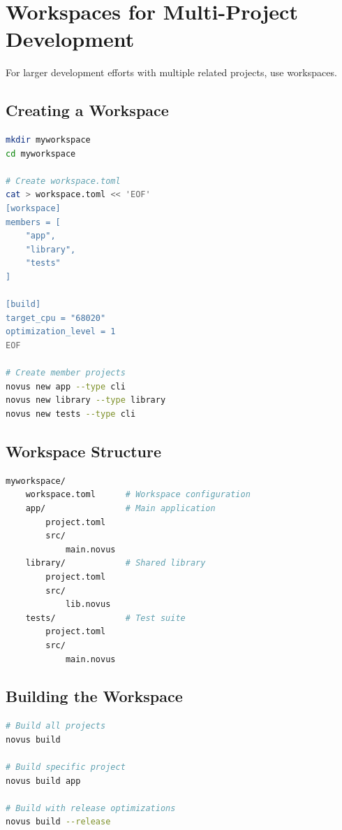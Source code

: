 \section{Workspaces for Multi-Project Development}
\label{sec:workspaces}

For larger development efforts with multiple related projects, use workspaces.

\subsection{Creating a Workspace}

\begin{lstlisting}[language=bash]
mkdir myworkspace
cd myworkspace

# Create workspace.toml
cat > workspace.toml << 'EOF'
[workspace]
members = [
    "app",
    "library",
    "tests"
]

[build]
target_cpu = "68020"
optimization_level = 1
EOF

# Create member projects
novus new app --type cli
novus new library --type library
novus new tests --type cli
\end{lstlisting}

\subsection{Workspace Structure}

\begin{lstlisting}[language=bash]
myworkspace/
    workspace.toml      # Workspace configuration
    app/                # Main application
        project.toml
        src/
            main.novus
    library/            # Shared library
        project.toml
        src/
            lib.novus
    tests/              # Test suite
        project.toml
        src/
            main.novus
\end{lstlisting}

\subsection{Building the Workspace}

\begin{lstlisting}[language=bash]
# Build all projects
novus build

# Build specific project
novus build app

# Build with release optimizations
novus build --release
\end{lstlisting}

